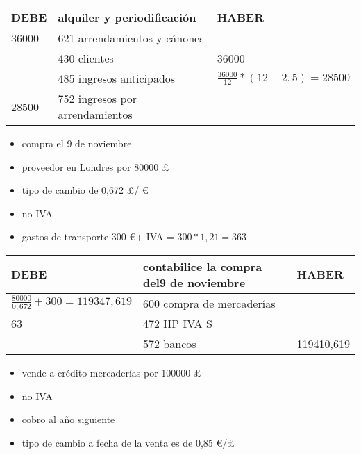 \documentclass[a4paper,12pt]{article}
\begin{document}
\begin{table}[H]
    \centering
    \begin{tabular}{|p{3cm}|p{6cm}|p{3cm}|}
    \hline
    \textbf{DEBE} & \textbf{alquiler y periodificación} & \textbf{HABER} \\
    \hline
    36000& 621 arrendamientos y cánones & \\
    \hline
    & 430 clientes  & 36000\\
    \hline
    & 485 ingresos anticipados & $\frac{36000}{12} * (12-2,5) = 28500$\\
    \hline
    28500 & 752 ingresos por arrendamientos& \\
    \hline
    \end{tabular}
\end{table}

\begin{itemize}
    \item compra el 9 de noviembre
    \item proveedor en Londres por 80000 \pounds 
    \item tipo de cambio de 0,672 \pounds / \euro
    \item no IVA
    \item gastos de transporte 300 \euro + IVA = $300 * 1,21 = 363$
\end{itemize}

\begin{table}[H]
    \centering
    \begin{tabular}{|p{3cm}|p{6cm}|p{3cm}|}
    \hline
    \textbf{DEBE} & \textbf{contabilice la compra del9 de noviembre} & \textbf{HABER} \\
    \hline
    $\frac{80000}{0,672} + 300 = 119347,619$& 600 compra de mercaderías & \\
    \hline
    63 & 472 HP IVA S& \\
    \hline
    & 572 bancos &119410,619 \\
    \hline
    \end{tabular}
\end{table}

\begin{itemize}
    \item vende a crédito mercaderías por 100000 \pounds
    \item no IVA
    \item cobro al año siguiente
    \item tipo de cambio a fecha de la venta es de 0,85 \euro/\pounds
\end{itemize}
\end{document}
